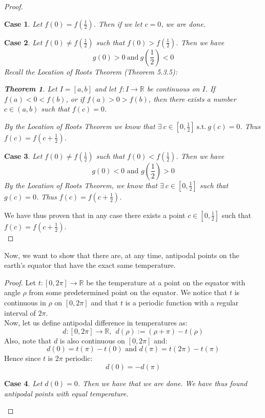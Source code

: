 \documentclass[12pt,letterpaper]{article}
\newcommand{\st}{\ \text{s.t.}\ }
\newcommand{\R}{\mathbb{R}}
\theoremstyle{case}
\newtheorem{case}{Case}
\theoremstyle{definition}
\newtheorem*{theorem*}{Theorem}
\begin{document}
\begin{enumerate}
\begin{enumerate}
\begin{proof}
					\begin{case}
						Let $f(0)=f(\frac{1}{2})$. Then if we let $c=0$, we are done.
					\end{case}
				
					\begin{case}
						Let $f(0) \neq f(\frac{1}{2})$ such that $f(0)>f(\frac{1}{2})$. Then we have
						\[g(0)>0\ \text{and}\ g\left(\frac{1}{2}\right)<0\]
						Recall the \textit{Location of Roots Theorem (Theorem 5.3.5)}:
						\begin{theorem*}
							Let $I=[a,b]$ and let $f:I \rightarrow \R$ be continuous on $I$. If $f(a) < 0 < f(b)$, or if $f(a) > 0 > f(b)$, then there exists a number $c \in (a,b)$ such that $f(c)=0$.
						\end{theorem*}
						By the \textit{Location of Roots Theorem} we know that $\exists\ c \in [0,\frac{1}{2}] \st g(c)=0$. Thus $f(c)=f(c+\frac{1}{2})$.
					\end{case}
				
					\begin{case}
						Let $f(0) \neq f(\frac{1}{2})$ such that $f(0)<f(\frac{1}{2})$. Then we have
						\[g(0) < 0 \text{ and } g\left(\frac{1}{2}\right)>0\]
						By the \textit{Location of Roots Theorem}, we know that $\exists\ c \in [0, \frac{1}{2}]$ such that $g(c)=0$. Thus $f(c)=f(c+\frac{1}{2})$.
					\end{case}
					We have thus proven that in any case there exists a point $c \in [0,\frac{1}{2}]$ such that $f(c)=f(c+\frac{1}{2})$.\\
				\end{proof}
				Now, we want to show that there are, at any time, antipodal points on the earth's equator that have the exact same temperature.\\
				
				\begin{proof}
					Let $t:[0,2\pi] \to \R$ be the temperature at a point on the equator with angle $\rho$ from some predetermined point on the equator. We notice that $t$ is continuous in $\rho$ on $[0,2\pi]$ and that $t$ is a periodic function with a regular interval of $2\pi$.\\
					
					Now, let us define antipodal difference in temperatures as:
					\[d:[0,2\pi] \to \R,\ \ d(\rho):=(\rho + \pi)-t(\rho)\]
					Also, note that $d$ is also continuous on $[0,2\pi]$ and:
					\[d(0)=t(\pi)-t(0) \text{ and } d(\pi)=t(2\pi)-t(\pi)\]
					Hence since $t$ is $2\pi$ periodic:
					\[d(0)=-d(\pi)\]
					\begin{case}
						Let $d(0)=0$. Then we have that we are done. We have thus found antipodal points with equal temperature.
					\end{case}
				

\end{proof}
\end{enumerate}
\end{enumerate}
\end{document}
